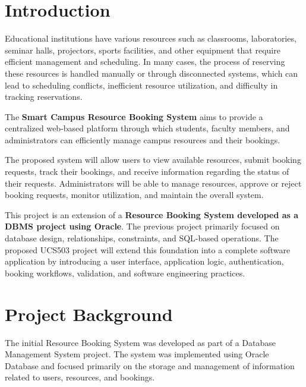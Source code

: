 \documentclass[12pt,a4paper]{article}
\begin{document}
\tableofcontents

\newpage



\section{Introduction}

Educational institutions have various resources such as classrooms, laboratories, seminar halls, projectors, sports facilities, and other equipment that require efficient management and scheduling. In many cases, the process of reserving these resources is handled manually or through disconnected systems, which can lead to scheduling conflicts, inefficient resource utilization, and difficulty in tracking reservations.

The \textbf{Smart Campus Resource Booking System} aims to provide a centralized web-based platform through which students, faculty members, and administrators can efficiently manage campus resources and their bookings.

The proposed system will allow users to view available resources, submit booking requests, track their bookings, and receive information regarding the status of their requests. Administrators will be able to manage resources, approve or reject booking requests, monitor utilization, and maintain the overall system.

This project is an extension of a \textbf{Resource Booking System developed as a DBMS project using Oracle}. The previous project primarily focused on database design, relationships, constraints, and SQL-based operations. The proposed UCS503 project will extend this foundation into a complete software application by introducing a user interface, application logic, authentication, booking workflows, validation, and software engineering practices.



\section{Project Background}

The initial Resource Booking System was developed as part of a Database Management System project. The system was implemented using Oracle Database and focused primarily on the storage and management of information related to users, resources, and bookings.
\end{document}
